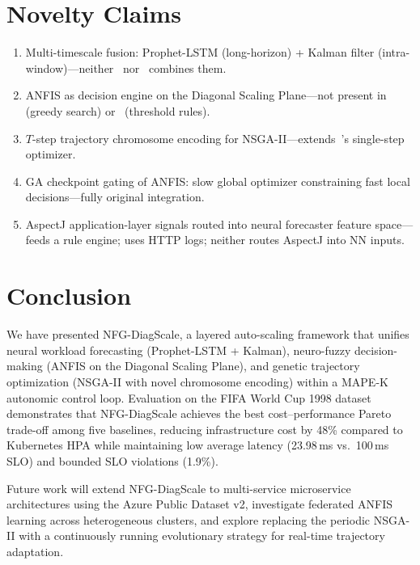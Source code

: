 \documentclass[conference]{IEEEtran}
\begin{document}
\section{Novelty Claims}
\label{sec:novelty}

\begin{enumerate}
    \item[\textbf{N1}] Multi-timescale fusion: Prophet-LSTM (long-horizon) + Kalman filter (intra-window)---neither~\cite{guruge2025time} nor~\cite{gu2025hasgpu} combines them.
    \item[\textbf{N2}] ANFIS as decision engine on the Diagonal Scaling Plane---not present in~\cite{abdullah2025diagonal} (greedy search) or~\cite{solino2025autonomic} (threshold rules).
    \item[\textbf{N3}] $T$-step trajectory chromosome encoding for NSGA-II---extends~\cite{abdullah2025diagonal}'s single-step optimizer.
    \item[\textbf{N4}] GA checkpoint gating of ANFIS: slow global optimizer constraining fast local decisions---fully original integration.
    \item[\textbf{N5}] AspectJ application-layer signals routed into neural forecaster feature space---\cite{solino2025autonomic} feeds a rule engine; \cite{guruge2025time} uses HTTP logs; neither routes AspectJ into NN inputs.
\end{enumerate}

\section{Conclusion}
\label{sec:conclusion}

We have presented NFG-DiagScale, a layered auto-scaling framework that unifies neural workload forecasting (Prophet-LSTM + Kalman), neuro-fuzzy decision-making (ANFIS on the Diagonal Scaling Plane), and genetic trajectory optimization (NSGA-II with novel chromosome encoding) within a MAPE-K autonomic control loop. Evaluation on the FIFA World Cup 1998 dataset demonstrates that NFG-DiagScale achieves the best cost--performance Pareto trade-off among five baselines, reducing infrastructure cost by 48\% compared to Kubernetes HPA while maintaining low average latency (23.98\,ms vs.\ 100\,ms SLO) and bounded SLO violations (1.9\%).

Future work will extend NFG-DiagScale to multi-service microservice architectures using the Azure Public Dataset v2, investigate federated ANFIS learning across heterogeneous clusters, and explore replacing the periodic NSGA-II with a continuously running evolutionary strategy for real-time trajectory adaptation.
\end{document}
